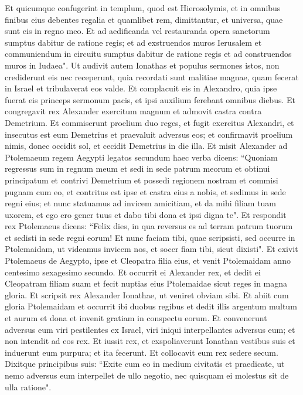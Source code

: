 \begin{biblechapter}
\verse Et quicumque confugerint in templum, quod est Hierosolymis, et in omnibus finibus eius debentes regalia et quamlibet rem, dimittantur, et universa, quae sunt eis in regno meo. 
\verse Et ad aedificanda vel restauranda opera sanctorum sumptus dabitur de ratione regis;  
\verse et ad exstruendos muros Ierusalem et communiendum in circuitu sumptus dabitur de ratione regis et ad construendos muros in Iudaea". 
\verse Ut audivit autem Ionathas et populus sermones istos, non crediderunt eis nec receperunt, quia recordati sunt malitiae magnae, quam fecerat in Israel et tribulaverat eos valde. 
\verse Et complacuit eis in Alexandro, quia ipse fuerat eis princeps sermonum pacis, et ipsi auxilium ferebant omnibus diebus. 
\verse Et congregavit rex Alexander exercitum magnum et admovit castra contra Demetrium. 
\verse Et commiserunt proelium duo reges, et fugit exercitus Alexandri, et insecutus est eum Demetrius et praevaluit adversus eos; 
\verse et confirmavit proelium nimis, donec occidit sol, et cecidit Demetrius in die illa. 
\verse Et misit Alexander ad Ptolemaeum regem Aegypti legatos secundum haec verba dicens: 
\verse “Quoniam regressus sum in regnum meum et sedi in sede patrum meorum et obtinui principatum et contrivi Demetrium et possedi regionem nostram 
\verse et commisi pugnam cum eo, et contritus est ipse et castra eius a nobis, et sedimus in sede regni eius; 
\verse et nunc statuamus ad invicem amicitiam, et da mihi filiam tuam uxorem, et ego ero gener tuus et dabo tibi dona et ipsi digna te". 
\verse Et respondit rex Ptolemaeus dicens: “Felix dies, in qua reversus es ad terram patrum tuorum et sedisti in sede regni eorum! 
\verse Et nunc faciam tibi, quae scripsisti, sed occurre in Ptolemaidam, ut videamus invicem nos, et socer fiam tibi, sicut dixisti". 
\verse Et exivit Ptolemaeus de Aegypto, ipse et Cleopatra filia eius, et venit Ptolemaidam anno centesimo sexagesimo secundo. 
\verse Et occurrit ei Alexander rex, et dedit ei Cleopatram filiam suam et fecit nuptias eius Ptolemaidae sicut reges in magna gloria. 
\verse Et scripsit rex Alexander Ionathae, ut veniret obviam sibi. 
\verse Et abiit cum gloria Ptolemaidam et occurrit ibi duobus regibus et dedit illis argentum multum et aurum et dona et invenit gratiam in conspectu eorum. 
\verse Et convenerunt adversus eum viri pestilentes ex Israel, viri iniqui interpellantes adversus eum; et non intendit ad eos rex. 
\verse Et iussit rex, et exspoliaverunt Ionathan vestibus suis et induerunt eum purpura; et ita fecerunt. Et collocavit eum rex sedere secum. 
\verse Dixitque principibus suis: “Exite cum eo in medium civitatis et praedicate, ut nemo adversus eum interpellet de ullo negotio, nec quisquam ei molestus sit de ulla ratione". 

\end{biblechapter}
